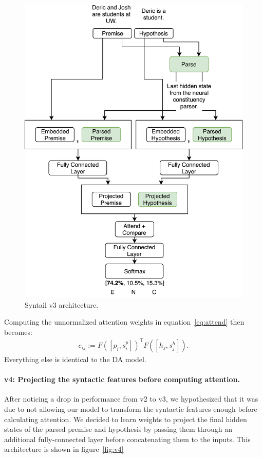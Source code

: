 \documentclass[11pt,a4paper]{article}
\begin{document}
\begin{figure}[htb]
  \centering
  \includegraphics[width=\linewidth]{figures/v3.png}
  \caption{Syntail v3 architecture.}
\label{fig:v3}
\end{figure}

Computing the unnormalized attention weights in equation~\ref{eq:attend} then
becomes:
\begin{align}
    e_{ij} := F([p_i, s^p_i])^\mathsf{T} F([h_j, s^h_j]).
\end{align}
Everything else is identical to the DA model.

\paragraph{v4: Projecting the syntactic features before computing attention.}
After noticing a drop in performance from v2 to v3, we hypothesized that it was
due to not allowing our model to transform the syntactic features enough before
calculating attention.  We decided to learn weights to project the final hidden
states of the parsed premise and hypothesis by passing them through an
additional fully-connected layer before concatenating them to the inputs. This
architecture is shown in figure~\ref{fig:v4}
\end{document}
